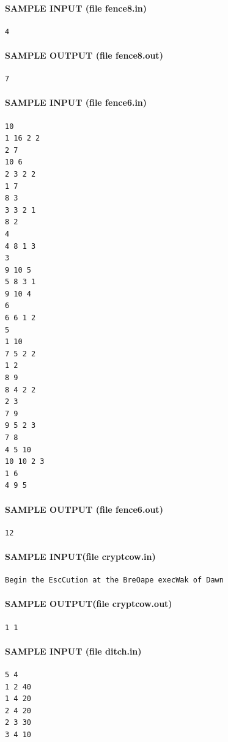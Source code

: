 \documentclass[11pt]{article}
\begin{document}
\paragraph{SAMPLE INPUT (file fence8.in)}
\begin{verbatim}
4
\end{verbatim}

\paragraph{SAMPLE OUTPUT (file fence8.out)}
\begin{verbatim}
7
\end{verbatim}

\paragraph{SAMPLE INPUT (file fence6.in)}
\begin{verbatim}
10
1 16 2 2
2 7
10 6
2 3 2 2
1 7
8 3
3 3 2 1
8 2
4
4 8 1 3
3
9 10 5
5 8 3 1
9 10 4
6
6 6 1 2
5
1 10
7 5 2 2
1 2
8 9
8 4 2 2
2 3
7 9
9 5 2 3
7 8
4 5 10
10 10 2 3
1 6
4 9 5
\end{verbatim}

\paragraph{SAMPLE OUTPUT (file fence6.out)}
\begin{verbatim}
12
\end{verbatim}

\paragraph{SAMPLE INPUT(file cryptcow.in)}
\begin{verbatim}
Begin the EscCution at the BreOape execWak of Dawn
\end{verbatim}

\paragraph{SAMPLE OUTPUT(file cryptcow.out)}
\begin{verbatim}
1 1
\end{verbatim}

\paragraph{SAMPLE INPUT (file ditch.in)}
\begin{verbatim}
5 4
1 2 40
1 4 20
2 4 20
2 3 30
3 4 10
\end{verbatim}
\end{document}
